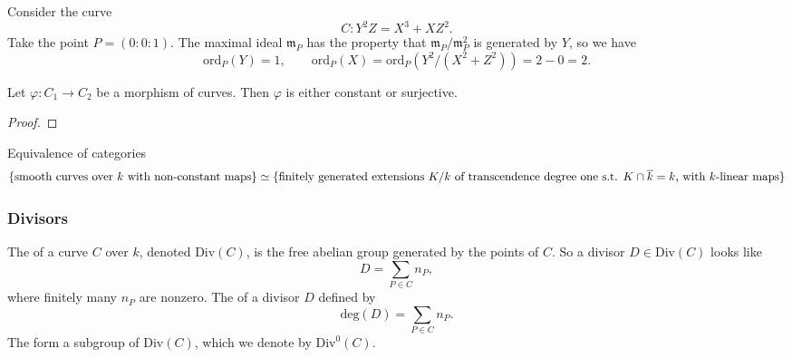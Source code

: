 \begin{example}
    Consider the curve
    \[ C : Y^2 Z = X^3 + X Z^2 . \]
    Take the point $P = (0 : 0 : 1)$. The maximal ideal $\mathfrak{m}_P$ has the property that $\mathfrak{m}_P / \mathfrak{m}_P^2$ is generated by $Y$, so we have
    \[
        \text{ord}_P(Y) = 1, \qquad
        \text{ord}_P(X) = \text{ord}_P(Y^2 / (X^2 + Z^2))
        = 2 - 0 = 2 . \]
\end{example}




\begin{theorem}
    Let $\varphi : C_1 \to C_2$ be a morphism of curves. Then $\varphi$ is either constant or surjective.
\end{theorem}

\begin{proof}
\end{proof}

\begin{theorem}
    Equivalence of categories
    \[ \{ \text{smooth curves over $k$ with non-constant maps} \} \simeq \\ \{ \text{finitely generated extensions $K/k$ of transcendence degree one s.t. $K \cap \overline{k} = k$, with $k$-linear maps} \} \]
\end{theorem}





\subsubsection{Divisors}

\begin{definition}
    The  of a curve $C$ over $k$, denoted $\text{Div}(C)$, is the free abelian group generated by the points of $C$. So a divisor $D \in \text{Div}(C)$ looks like
    \[ D = \sum_{P \in C} n_P , \]
    where finitely many $n_P$ are nonzero.
    The  of a divisor $D$ defined by
    \[ \text{deg}(D) = \sum_{P \in C} n_P . \]
    The  form a subgroup of $\text{Div}(C)$, which we denote by $\text{Div}^0(C)$.
\end{definition}

